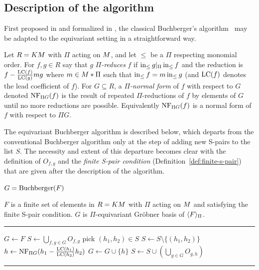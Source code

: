 \subsection{Description of the algorithm}
First proposed in \cite{aschenbrenner2007finite} and formalized in \cite{Brouwer09e}, the classical Buchberger's algorithm~\cite{buchberger1985grobner} may be adapted to the equivariant setting in a straightforward way.

Let $R = KM$ with $\Pi$ acting on $M$, and let $\leq$ be a $\Pi$ respecting monomial order.  For $f,g \in R$ say that $g$ {\em $\Pi$-reduces} $f$ if $\operatorname{in}_{\leq} g |_{\Pi} \operatorname{in}_{\leq} f$ and the reduction is $f - \frac{\operatorname{LC}(f)}{\operatorname{LC}(g)}mg$ where $m \in M *\Pi$ such that $\operatorname{in}_{\leq} f = m\operatorname{in}_{\leq} g$ (and $\operatorname{LC}(f)$ denotes the lead coefficient of $f$).  For $G \subseteq R$, a {\em $\Pi$-normal form} of $f$ with respect to $G$ denoted $\operatorname{NF}_{\Pi G}(f)$ is the result of repeated $\Pi$-reductions of $f$ by elements of $G$ until no more reductions are possible.  Equivalently $\operatorname{NF}_{\Pi G}(f)$ is a normal form of $f$ with respect to $\Pi G$.

The equivariant Buchberger algorithm is described below, which departs from the conventional Buchberger algorithm only at the step of adding new S-pairs to the list $S$.  The necessity and extent of this departure becomes clear with the definition of $O_{f,g}$ and the {\em finite S-pair condition} (Definition~\ref{def:finite-s-pair}) that are given after the description of the algorithm.

\begin{algorithm}\label{alg:Buchberger}
$G = \operatorname{Buchberger}(F)$
\begin{algorithmic}[1]
\REQUIRE $F$ is a finite set of elements in $R = KM$ with $\Pi$ acting on $M$ and satisfying the finite S-pair condition.
\ENSURE $G$ is $\Pi$-equivariant Gr\"obner basis of $\langle F \rangle_{\Pi}$.

\smallskip \hrule \smallskip

\STATE $G\gets F$
\STATE $S\gets \bigcup_{f,g\in G} O_{f,g}$
	\STATE pick $(h_1,h_2) \in S$
	\STATE $S\gets S\setminus\{(h_1,h_2)\}$ 
	\STATE $h \gets \operatorname{NF}_{\Pi G}(h_1 - \frac{\operatorname{LC}(h_1)}{\operatorname{LC}(h_2)}h_2)$
		\STATE $G\gets G\cup \{h\}$
		\STATE $S\gets S\cup \left(\bigcup_{g\in G}O_{g,h}\right)$
	\ENDIF
\ENDWHILE
\smallskip \hrule \smallskip
\end{algorithmic}
\end{algorithm}

